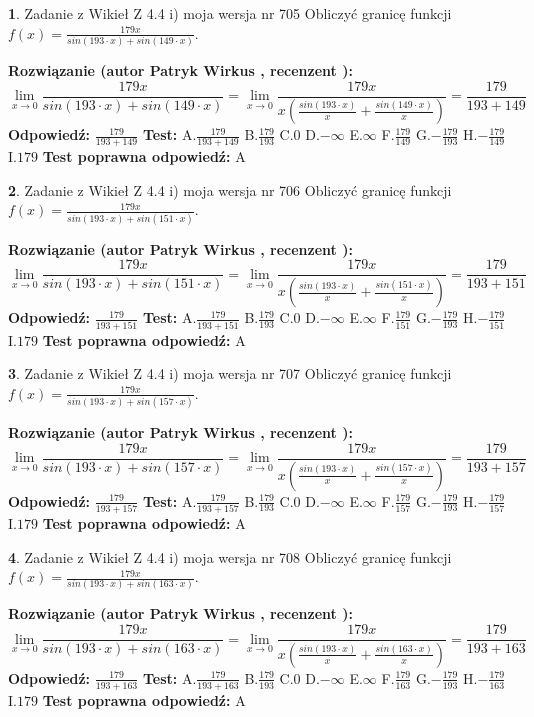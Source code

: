 \documentclass[12pt, a4paper]{article}
\theoremstyle{definition} %
\newtheorem{zad}{}
\newcommand{\zadStart}[1]{\begin{zad}#1\newline}
\newcommand{\zadStop}{\end{zad}}
\newcommand{\rozwStart}[2]{\noindent \textbf{Rozwiązanie (autor #1 , recenzent #2): }\newline}
\newcommand{\rozwStop}{\newline}
\newcommand{\odpStart}{\noindent \textbf{Odpowiedź:}\newline}
\newcommand{\odpStop}{\newline}
\newcommand{\testStart}{\noindent \textbf{Test:}\newline}
\newcommand{\testStop}{\newline}
\newcommand{\kluczStart}{\noindent \textbf{Test poprawna odpowiedź:}\newline}
\newcommand{\kluczStop}{\newline}
\begin{document}
\zadStart{Zadanie z Wikieł Z 4.4 i) moja wersja nr 705}
Obliczyć granicę funkcji $f(x)=\frac{179x}{sin(193\cdot x) +sin(149\cdot x)}$.
\zadStop
\rozwStart{Patryk Wirkus}{}
$$\lim\limits_{x\to 0}\frac{179x}{sin(193\cdot x) +sin(149\cdot x)}=\lim\limits_{x\to 0}\frac{179x}{x(\frac{sin(193\cdot x)}{x}+\frac{sin(149\cdot x)}{x})}=\frac{179}{193+149}$$
\rozwStop
\odpStart
$\frac{179}{193+149}$
\odpStop
\testStart
A.$\frac{179}{193+149}$
B.$\frac{179}{193}$
C.$0$
D.$-\infty$
E.$\infty$
F.$\frac{179}{149}$
G.$-\frac{179}{193}$
H.$-\frac{179}{149}$
I.$179$
\testStop
\kluczStart
A
\kluczStop



\zadStart{Zadanie z Wikieł Z 4.4 i) moja wersja nr 706}
Obliczyć granicę funkcji $f(x)=\frac{179x}{sin(193\cdot x) +sin(151\cdot x)}$.
\zadStop
\rozwStart{Patryk Wirkus}{}
$$\lim\limits_{x\to 0}\frac{179x}{sin(193\cdot x) +sin(151\cdot x)}=\lim\limits_{x\to 0}\frac{179x}{x(\frac{sin(193\cdot x)}{x}+\frac{sin(151\cdot x)}{x})}=\frac{179}{193+151}$$
\rozwStop
\odpStart
$\frac{179}{193+151}$
\odpStop
\testStart
A.$\frac{179}{193+151}$
B.$\frac{179}{193}$
C.$0$
D.$-\infty$
E.$\infty$
F.$\frac{179}{151}$
G.$-\frac{179}{193}$
H.$-\frac{179}{151}$
I.$179$
\testStop
\kluczStart
A
\kluczStop



\zadStart{Zadanie z Wikieł Z 4.4 i) moja wersja nr 707}
Obliczyć granicę funkcji $f(x)=\frac{179x}{sin(193\cdot x) +sin(157\cdot x)}$.
\zadStop
\rozwStart{Patryk Wirkus}{}
$$\lim\limits_{x\to 0}\frac{179x}{sin(193\cdot x) +sin(157\cdot x)}=\lim\limits_{x\to 0}\frac{179x}{x(\frac{sin(193\cdot x)}{x}+\frac{sin(157\cdot x)}{x})}=\frac{179}{193+157}$$
\rozwStop
\odpStart
$\frac{179}{193+157}$
\odpStop
\testStart
A.$\frac{179}{193+157}$
B.$\frac{179}{193}$
C.$0$
D.$-\infty$
E.$\infty$
F.$\frac{179}{157}$
G.$-\frac{179}{193}$
H.$-\frac{179}{157}$
I.$179$
\testStop
\kluczStart
A
\kluczStop



\zadStart{Zadanie z Wikieł Z 4.4 i) moja wersja nr 708}
Obliczyć granicę funkcji $f(x)=\frac{179x}{sin(193\cdot x) +sin(163\cdot x)}$.
\zadStop
\rozwStart{Patryk Wirkus}{}
$$\lim\limits_{x\to 0}\frac{179x}{sin(193\cdot x) +sin(163\cdot x)}=\lim\limits_{x\to 0}\frac{179x}{x(\frac{sin(193\cdot x)}{x}+\frac{sin(163\cdot x)}{x})}=\frac{179}{193+163}$$
\rozwStop
\odpStart
$\frac{179}{193+163}$
\odpStop
\testStart
A.$\frac{179}{193+163}$
B.$\frac{179}{193}$
C.$0$
D.$-\infty$
E.$\infty$
F.$\frac{179}{163}$
G.$-\frac{179}{193}$
H.$-\frac{179}{163}$
I.$179$
\testStop
\kluczStart
A
\kluczStop
\end{document}
